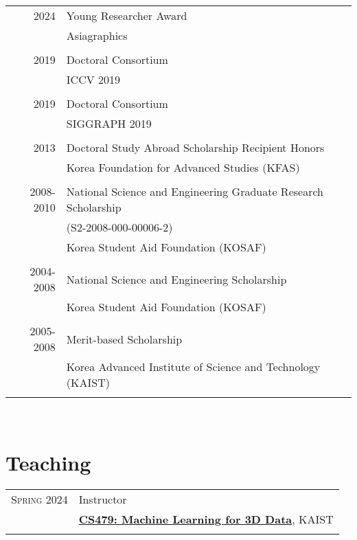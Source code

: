 \documentclass[letterpaper,10pt]{article} %
\newcommand{\blankline}{\quad\pagebreak[2]}
\begin{document}
{{%
\begin{tabular}{r|p{11cm}}
2024 & Young Researcher Award\\
& Asiagraphics\\
&\\
2019 & Doctoral Consortium\\
& ICCV 2019\\
&\\
2019 & Doctoral Consortium\\
& SIGGRAPH 2019\\
&\\
2013 & Doctoral Study Abroad Scholarship Recipient Honors\\
& Korea Foundation for Advanced Studies (KFAS)\\
&\\
2008-2010 & National Science and Engineering Graduate Research Scholarship\\
& (S2-2008-000-00006-2)\\
& Korea Student Aid Foundation (KOSAF)\\
&\\
2004-2008 & National Science and Engineering Scholarship \\
& Korea Student Aid Foundation (KOSAF)\\
&\\
2005-2008 & Merit-based Scholarship\\
& Korea Advanced Institute of Science and Technology (KAIST)\\
&\\
\end{tabular}\\

\blankline



\section{Teaching}

\begin{tabular}{r|p{11cm}}

\textsc{Spring 2024} & Instructor\\
& \href{https://mhsung.github.io/kaist-cs479-spring-2025/}{\textbf{CS479: Machine Learning for 3D Data}}, KAIST\\
& \\


\end{tabular}}}
\end{document}
